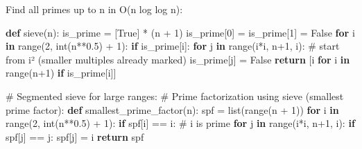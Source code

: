 \documentclass[11pt]{article}
\newenvironment{Shaded}{\begin{snugshade}}{\end{snugshade}}
\newcommand{\BuiltInTok}[1]{\textcolor[rgb]{0.50,0.55,0.55}{#1}}
\newcommand{\CommentTok}[1]{\textcolor[rgb]{0.48,0.49,0.49}{#1}}
\newcommand{\ControlFlowTok}[1]{\textcolor[rgb]{0.99,0.74,0.29}{\textbf{#1}}}
\newcommand{\DecValTok}[1]{\textcolor[rgb]{0.96,0.45,0.00}{#1}}
\newcommand{\FloatTok}[1]{\textcolor[rgb]{0.96,0.45,0.00}{#1}}
\newcommand{\KeywordTok}[1]{\textcolor[rgb]{0.81,0.81,0.76}{\textbf{#1}}}
\newcommand{\NormalTok}[1]{\textcolor[rgb]{0.81,0.81,0.76}{#1}}
\newcommand{\OperatorTok}[1]{\textcolor[rgb]{0.81,0.81,0.76}{#1}}
\newcommand{\VariableTok}[1]{\textcolor[rgb]{0.15,0.68,0.68}{#1}}
\begin{document}
Find all primes up to n in O(n log log n):


\begin{Shaded}
\begin{Highlighting}[]
\KeywordTok{def}\NormalTok{ sieve(n):}
\NormalTok{    is\_prime }\OperatorTok{=}\NormalTok{ [}\VariableTok{True}\NormalTok{] }\OperatorTok{*}\NormalTok{ (n }\OperatorTok{+} \DecValTok{1}\NormalTok{)}
\NormalTok{    is\_prime[}\DecValTok{0}\NormalTok{] }\OperatorTok{=}\NormalTok{ is\_prime[}\DecValTok{1}\NormalTok{] }\OperatorTok{=} \VariableTok{False}
    \ControlFlowTok{for}\NormalTok{ i }\KeywordTok{in} \BuiltInTok{range}\NormalTok{(}\DecValTok{2}\NormalTok{, }\BuiltInTok{int}\NormalTok{(n}\OperatorTok{**}\FloatTok{0.5}\NormalTok{) }\OperatorTok{+} \DecValTok{1}\NormalTok{):}
        \ControlFlowTok{if}\NormalTok{ is\_prime[i]:}
            \ControlFlowTok{for}\NormalTok{ j }\KeywordTok{in} \BuiltInTok{range}\NormalTok{(i}\OperatorTok{*}\NormalTok{i, n}\OperatorTok{+}\DecValTok{1}\NormalTok{, i):   }\CommentTok{\# start from i² (smaller multiples already marked)}
\NormalTok{                is\_prime[j] }\OperatorTok{=} \VariableTok{False}
    \ControlFlowTok{return}\NormalTok{ [i }\ControlFlowTok{for}\NormalTok{ i }\KeywordTok{in} \BuiltInTok{range}\NormalTok{(n}\OperatorTok{+}\DecValTok{1}\NormalTok{) }\ControlFlowTok{if}\NormalTok{ is\_prime[i]]}

\CommentTok{\# Segmented sieve for large ranges:}
\CommentTok{\# Prime factorization using sieve (smallest prime factor):}
\KeywordTok{def}\NormalTok{ smallest\_prime\_factor(n):}
\NormalTok{    spf }\OperatorTok{=} \BuiltInTok{list}\NormalTok{(}\BuiltInTok{range}\NormalTok{(n }\OperatorTok{+} \DecValTok{1}\NormalTok{))}
    \ControlFlowTok{for}\NormalTok{ i }\KeywordTok{in} \BuiltInTok{range}\NormalTok{(}\DecValTok{2}\NormalTok{, }\BuiltInTok{int}\NormalTok{(n}\OperatorTok{**}\FloatTok{0.5}\NormalTok{) }\OperatorTok{+} \DecValTok{1}\NormalTok{):}
        \ControlFlowTok{if}\NormalTok{ spf[i] }\OperatorTok{==}\NormalTok{ i:   }\CommentTok{\# i is prime}
            \ControlFlowTok{for}\NormalTok{ j }\KeywordTok{in} \BuiltInTok{range}\NormalTok{(i}\OperatorTok{*}\NormalTok{i, n}\OperatorTok{+}\DecValTok{1}\NormalTok{, i):}
                \ControlFlowTok{if}\NormalTok{ spf[j] }\OperatorTok{==}\NormalTok{ j:}
\NormalTok{                    spf[j] }\OperatorTok{=}\NormalTok{ i}
    \ControlFlowTok{return}\NormalTok{ spf}
\end{Highlighting}
\end{Shaded}
\end{document}
